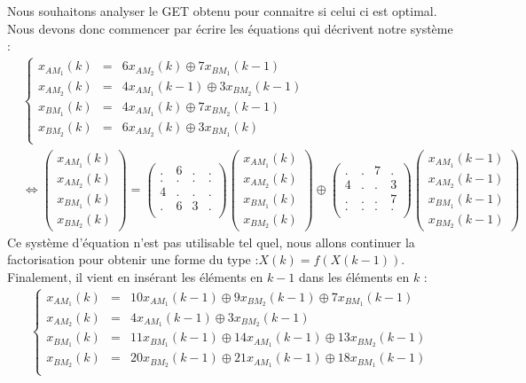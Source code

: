 Nous souhaitons analyser le GET obtenu pour connaitre si celui ci est optimal. Nous devons donc commencer par écrire les équations qui décrivent notre système :  
\begin{align*}
&\left\lbrace
\begin{array}{lcl}
x_{AM_1}(k)&=&  6x_{AM_2}(k) \oplus 7x_{BM_1}(k-1)\\
x_{AM_2}(k)&=&4x_{AM_1}(k-1) \oplus 3x_{BM_2}(k-1)\\
x_{BM_1}(k)&=& 4x_{AM_1}(k) \oplus 7x_{BM_2}(k-1)\\
x_{BM_2}(k)&=& 6x_{AM_2}(k) \oplus 3x_{BM_1}(k)\\
\end{array}
\right.\\
&\Leftrightarrow \begin{pmatrix}
x_{AM_1}(k)\\
x_{AM_2}(k)\\
x_{BM_1}(k)\\
x_{BM_2}(k)
\end{pmatrix} = \begin{pmatrix}
. & 6 & . & .\\
. & . & . & .\\
4 & . & . & .\\
. & 6 & 3 & .\\
\end{pmatrix} \begin{pmatrix}
x_{AM_1}(k)\\
x_{AM_2}(k)\\
x_{BM_1}(k)\\
x_{BM_2}(k)
\end{pmatrix} \oplus \begin{pmatrix}
. & . & 7 & .\\
4 & . & . & 3\\
. & . & . & 7\\
. & . & . & .\\
\end{pmatrix} \begin{pmatrix}
x_{AM_1}(k-1)\\
x_{AM_2}(k-1)\\
x_{BM_1}(k-1)\\
x_{BM_2}(k-1)
\end{pmatrix}
\end{align*}
Ce système d'équation n'est pas utilisable tel quel, nous allons continuer la factorisation pour obtenir une forme du type :$X(k)=f(X(k-1))$. Finalement, il vient en insérant les éléments en $k-1$ dans les éléments en $k$ : 
\begin{align*}
\left\lbrace
\begin{array}{lcl}
x_{AM_1}(k)&=& 10x_{AM_1}(k-1) \oplus 9x_{BM_2}(k-1)\oplus 7x_{BM_1}(k-1)\\
x_{AM_2}(k)&=&4x_{AM_1}(k-1) \oplus 3x_{BM_2}(k-1)\\
x_{BM_1}(k)&=& 11x_{BM_1}(k-1) \oplus 14x_{AM_1}(k-1) \oplus 13x_{BM_2}(k-1)\\
x_{BM_2}(k)&=& 20x_{BM_2}(k-1) \oplus 21x_{AM_1}(k-1) \oplus 18x_{BM_1}(k-1)\\
\end{array}
\right.
\end{align*}
